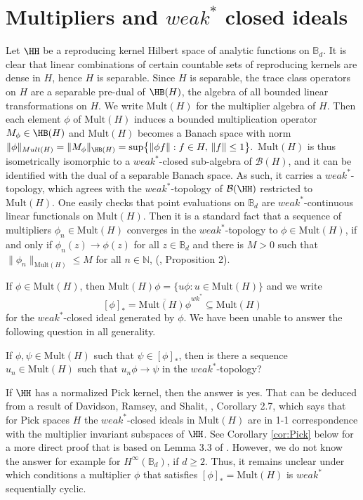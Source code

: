 \documentclass{article}
\numberwithin{equation}{section}
\newcommand{\MH}{\mathrm{Mult}( H)}
\newcommand{\Bd}{\mathbb B_d}
\begin{document}
\section{Multipliers and \texorpdfstring{$weak^\ast$}{weak*} closed ideals}
 Let $\HH$ be a reproducing kernel Hilbert space of analytic functions on $\Bd$. It is clear that linear combinations of certain countable sets of reproducing kernels are dense in $H$, hence $H$ is separable. Since $H$ is separable,  the trace class operators on $H$ are a separable pre-dual of $\HB(H)$, the algebra of all bounded linear transformations on $H$. We write $\MH$ for the multiplier algebra of $H$. Then each element $\phi$ of $\MH$ induces a bounded multiplication operator $M_\phi\in \HB(H)$ and $\MH$ becomes a Banach space with norm $\|\phi\|
_{Mult(H)}=\|M_\phi\|_{\HB(H)}= 
\sup
\bigl\{
\|\phi f\|
:
f \in H,\,
\|f\|\le 1
\bigr\}.$  
$\MH$ is thus  isometrically isomorphic to a $weak^\ast$-closed sub-algebra of $\mathcal{B}(H)$, and it can be identified with the dual of a separable Banach space. As such, it carries a $weak^\ast$-topology, which agrees with the $weak^\ast$-topology of $\mathcal{B}(\HH)$ restricted to $\MH$. One easily checks that point evaluations on $\Bd$ are $weak^\ast$-continuous linear functionals on $\MH$. Then it is a standard fact that a sequence of multipliers $\phi_n \in \MH$ converges in the $weak^\ast$-topology to $\phi\in \MH$, if and only if $\phi_n(z) \to \phi(z)$ for all $z\in \Bd$ and there is $M>0$ such that $\|\phi_n\|_{\MH}\le M$ for all $n \in \mathbb{N}$, (\cite{BrownShields1984}, {Proposition 2}).
 
 If $\phi\in \MH$, then $\MH \phi= \{u\phi: u\in \MH\}$ and we write $$[\phi]_*=\overline{\MH \phi}^{wk^*}\subseteq \MH$$ for the $weak^\ast$-closed ideal generated by $\phi$. We have been unable to answer the following question in all generality.
 
 \begin{quest}  \label{ques:weak*}
 If $\phi, \psi \in \MH$ such that $\psi \in [\phi]_*$, then is there a sequence $u_n\in \MH$ such that $u_n \phi \to \psi$ in the $weak^\ast$-topology?\end{quest}

  
  If $\HH$ has a normalized Pick kernel, then the answer is yes. That can be deduced  from a result of Davidson, Ramsey, and Shalit, \cite{DavidsonRamseyShalit2015}, Corollary 2.7, which says that for Pick spaces $H$ the $weak^\ast$-closed ideals in $\MH$ are in 1-1 correspondence with the multiplier invariant subspaces of $\HH$. See Corollary \ref{cor:Pick} below for a more direct proof that is based on Lemma 3.3 of \cite{AlemanHartzMcCarthyRichter2023}. However, we do not know the answer for example for $H^\infty(\Bd)$, if $d \ge 2$. Thus, it remains unclear under which conditions a multiplier $\phi$ that satisfies $[\phi]_*=\MH$ is $weak^\ast$ sequentially cyclic.
  
\end{document}
